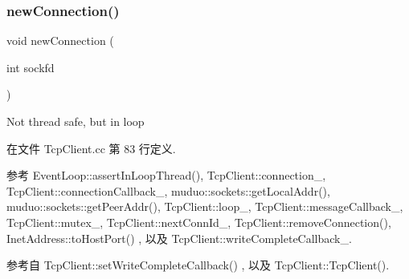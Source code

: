 \subsubsection{\texorpdfstring{new\+Connection()}{newConnection()}}
{\footnotesize\ttfamily void new\+Connection (\begin{DoxyParamCaption}\item[{int}]{sockfd }\end{DoxyParamCaption})\hspace{0.3cm}{\ttfamily [private]}}



Not thread safe, but in loop 



在文件 Tcp\+Client.\+cc 第 83 行定义.



参考 Event\+Loop\+::assert\+In\+Loop\+Thread(), Tcp\+Client\+::connection\+\_\+, Tcp\+Client\+::connection\+Callback\+\_\+, muduo\+::sockets\+::get\+Local\+Addr(), muduo\+::sockets\+::get\+Peer\+Addr(), Tcp\+Client\+::loop\+\_\+, Tcp\+Client\+::message\+Callback\+\_\+, Tcp\+Client\+::mutex\+\_\+, Tcp\+Client\+::next\+Conn\+Id\+\_\+, Tcp\+Client\+::remove\+Connection(), Inet\+Address\+::to\+Host\+Port() , 以及 Tcp\+Client\+::write\+Complete\+Callback\+\_\+.



参考自 Tcp\+Client\+::set\+Write\+Complete\+Callback() , 以及 Tcp\+Client\+::\+Tcp\+Client().

